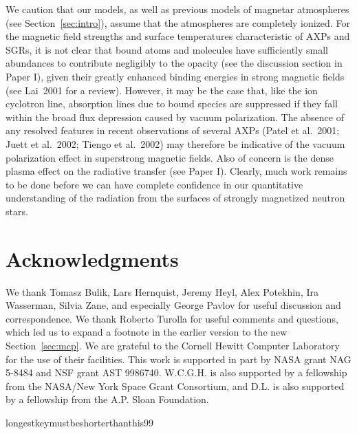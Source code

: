 \documentclass{mn2e}
\newcommand{\etal}{et al.}
\newcommand{\holai}{Paper I}
\begin{document}
{{We caution that our models, as well as previous models of magnetar
atmospheres (see Section~\ref{sec:intro}), assume that the atmospheres
are completely ionized.  For the magnetic field strengths and
surface temperatures
characteristic of AXPs and SGRs, it is not clear that
bound atoms and molecules have sufficiently small
abundances to contribute negligibly to the opacity
(see the discussion section in \holai), given their greatly
enhanced binding energies in strong magnetic fields
(see Lai~2001 for a review).
However, it may be the case that, like the ion cyclotron line,
absorption lines due to bound species are suppressed if they fall
within the broad flux depression caused by vacuum polarization.
The absence of any resolved features in recent observations of
several AXPs (Patel \etal~2001; Juett \etal~2002; Tiengo \etal~2002)
may therefore be indicative of the vacuum polarization effect in
superstrong magnetic fields.
Also of concern is the
dense plasma effect on the radiative transfer (see \holai).
Clearly, much work remains to be done before we can have complete
confidence in our quantitative understanding of the radiation
from the surfaces of strongly magnetized neutron stars.

\section*{Acknowledgments}

We thank Tomasz Bulik, Lars Hernquist, Jeremy Heyl,
Alex Potekhin, Ira Wasserman, Silvia Zane, and especially George
Pavlov for useful discussion and correspondence.
We thank Roberto Turolla for useful comments and questions, which
led us to expand a footnote in the earlier version to the new
Section~\ref{sec:mcp}.
We are grateful to the Cornell Hewitt Computer Laboratory for the
use of their facilities.
This work is supported in part by NASA grant
NAG 5-8484 and NSF grant AST 9986740.
W.C.G.H. is also supported by a fellowship from the
NASA/New York Space Grant Consortium, and D.L. is also supported
by a fellowship from the A.P. Sloan Foundation.

\begin{thebibliography}{longestkeymustbeshorterthanthis99}


\end{thebibliography}}}
\end{document}
